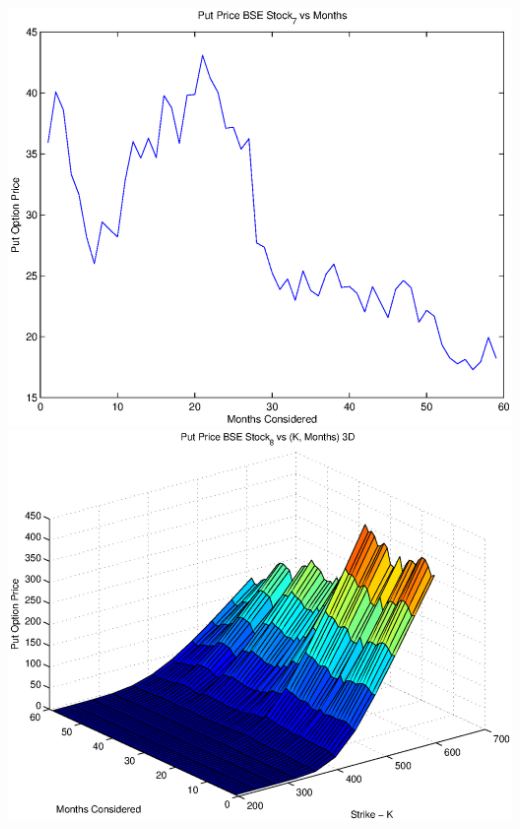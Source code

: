 \documentclass{article}
\begin{document}
\includegraphics[width=\textwidth]{Put_Price_BSE_Stock_7_vs_Months} \\

\includegraphics[width=\textwidth]{Put_Price_BSE_Stock_8_vs_(K,_Months)_3D} \\
\end{document}
